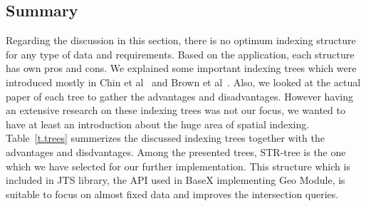 \documentclass[a4paper,12pt]{article}
\begin{document}

\subsection{Summary}
Regarding the discussion in this section, there is no optimum indexing structure for any type of data and requirements. Based on the application, each structure has own pros and cons. We explained some important indexing trees which were introduced mostly in Chin et al~\cite{survey} and Brown et al~\cite{tree-basedindexes}. Also, we looked at the actual paper of each tree to gather the advantages and disadvantages. However having an extensive research on these indexing trees was not our focus, we wanted to have at least an introduction about the huge area of spatial indexing. 
Table~\ref{t.trees} summerizes the discussed indexing trees together with the advantages and disdvantages. 
Among the presented trees, STR-tree is the one which we have selected for our further implementation. This structure which is included in JTS library, the API used in BaseX implementing Geo Module, is suitable to focus on almost fixed data and improves the intersection queries. %
\end{document}
